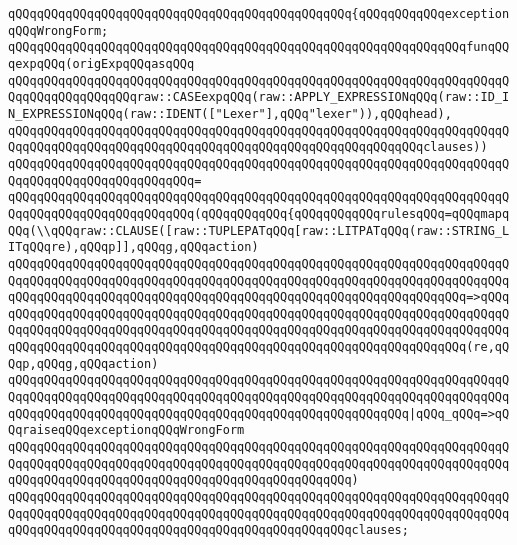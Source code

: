 \verb|qQQqqQQqqQQqqQQqqQQqqQQqqQQqqQQqqQQqqQQqqQQqqQQq{qQQqqQQqqQQqexceptionqQQqWrongForm;|\newline
\newline
\verb|qQQqqQQqqQQqqQQqqQQqqQQqqQQqqQQqqQQqqQQqqQQqqQQqqQQqqQQqqQQqqQQqfunqQQqexpqQQq(origExpqQQqasqQQq|\newline
\verb|qQQqqQQqqQQqqQQqqQQqqQQqqQQqqQQqqQQqqQQqqQQqqQQqqQQqqQQqqQQqqQQqqQQqqQQqqQQqqQQqqQQqqQQqraw::CASEexpqQQq(raw::APPLY_EXPRESSIONqQQq(raw::ID_IN_EXPRESSIONqQQq(raw::IDENT(["Lexer"],qQQq"lexer")),qQQqhead),|\newline
\verb|qQQqqQQqqQQqqQQqqQQqqQQqqQQqqQQqqQQqqQQqqQQqqQQqqQQqqQQqqQQqqQQqqQQqqQQqqQQqqQQqqQQqqQQqqQQqqQQqqQQqqQQqqQQqqQQqqQQqqQQqqQQqqQQqclauses))|\newline
\verb|qQQqqQQqqQQqqQQqqQQqqQQqqQQqqQQqqQQqqQQqqQQqqQQqqQQqqQQqqQQqqQQqqQQqqQQqqQQqqQQqqQQqqQQqqQQqqQQq=|\newline
\verb|qQQqqQQqqQQqqQQqqQQqqQQqqQQqqQQqqQQqqQQqqQQqqQQqqQQqqQQqqQQqqQQqqQQqqQQqqQQqqQQqqQQqqQQqqQQqqQQq(qQQqqQQqqQQq{qQQqqQQqqQQqrulesqQQq=qQQqmapqQQq(\\qQQqraw::CLAUSE([raw::TUPLEPATqQQq[raw::LITPATqQQq(raw::STRING_LITqQQqre),qQQqp]],qQQqg,qQQqaction)|\newline
\verb|qQQqqQQqqQQqqQQqqQQqqQQqqQQqqQQqqQQqqQQqqQQqqQQqqQQqqQQqqQQqqQQqqQQqqQQqqQQqqQQqqQQqqQQqqQQqqQQqqQQqqQQqqQQqqQQqqQQqqQQqqQQqqQQqqQQqqQQqqQQqqQQqqQQqqQQqqQQqqQQqqQQqqQQqqQQqqQQqqQQqqQQqqQQqqQQqqQQqqQQqqQQq=>qQQq|\newline
\verb|qQQqqQQqqQQqqQQqqQQqqQQqqQQqqQQqqQQqqQQqqQQqqQQqqQQqqQQqqQQqqQQqqQQqqQQqqQQqqQQqqQQqqQQqqQQqqQQqqQQqqQQqqQQqqQQqqQQqqQQqqQQqqQQqqQQqqQQqqQQqqQQqqQQqqQQqqQQqqQQqqQQqqQQqqQQqqQQqqQQqqQQqqQQqqQQqqQQqqQQqqQQq(re,qQQqp,qQQqg,qQQqaction)|\newline
\verb|qQQqqQQqqQQqqQQqqQQqqQQqqQQqqQQqqQQqqQQqqQQqqQQqqQQqqQQqqQQqqQQqqQQqqQQqqQQqqQQqqQQqqQQqqQQqqQQqqQQqqQQqqQQqqQQqqQQqqQQqqQQqqQQqqQQqqQQqqQQqqQQqqQQqqQQqqQQqqQQqqQQqqQQqqQQqqQQqqQQqqQQqqQQqqQQqqQQq|\verb#|qQQq_qQQq=>qQQqraiseqQQqexceptionqQQqWrongForm#\newline
\verb|qQQqqQQqqQQqqQQqqQQqqQQqqQQqqQQqqQQqqQQqqQQqqQQqqQQqqQQqqQQqqQQqqQQqqQQqqQQqqQQqqQQqqQQqqQQqqQQqqQQqqQQqqQQqqQQqqQQqqQQqqQQqqQQqqQQqqQQqqQQqqQQqqQQqqQQqqQQqqQQqqQQqqQQqqQQqqQQqqQQqqQQqqQQq)|\newline
\verb|qQQqqQQqqQQqqQQqqQQqqQQqqQQqqQQqqQQqqQQqqQQqqQQqqQQqqQQqqQQqqQQqqQQqqQQqqQQqqQQqqQQqqQQqqQQqqQQqqQQqqQQqqQQqqQQqqQQqqQQqqQQqqQQqqQQqqQQqqQQqqQQqqQQqqQQqqQQqqQQqqQQqqQQqqQQqqQQqqQQqqQQqqQQqclauses;|\newline
